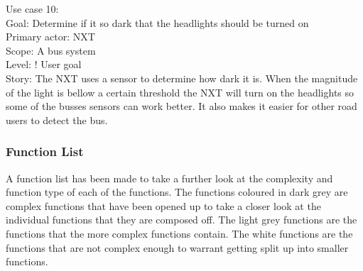 Use case 10:\\
Goal: Determine if it so dark that the headlights should be turned on\\
Primary actor: NXT\\
Scope: A bus system\\
Level: ! User goal\\
Story: The NXT uses a sensor to determine how dark it is. When the magnitude of the light is bellow a certain threshold the NXT will turn on the headlights so some of the busses sensors can work better. It also makes it easier for other road users to detect the bus.



\subsubsection{Function List}
A function list has been made to take a further look at the complexity and function type of each of the functions. The functions coloured in dark grey are complex functions that have been opened up to take a closer look at the individual functions that they are composed off. The light grey functions are the functions that the more complex functions contain. The white functions are the functions that are not complex enough to warrant getting split up into smaller functions.

